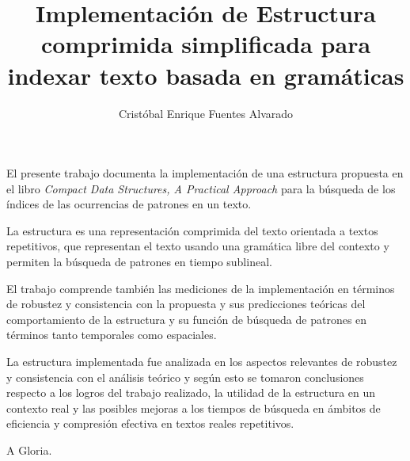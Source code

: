 \documentclass{umemoria}
\author{Cristóbal Enrique Fuentes Alvarado}
\title{Implementación de Estructura comprimida simplificada para indexar texto basada en gramáticas}
\begin{document}
\frontmatter
\maketitle

\begin{resumen}

El presente trabajo documenta la implementación de una estructura propuesta en el libro \textit{Compact Data Structures, A Practical Approach} para la búsqueda de los índices de las ocurrencias de patrones en un texto. 

La estructura es una representación comprimida del texto orientada a textos
repetitivos, que representan el texto usando una gramática libre del contexto
y permiten la búsqueda de patrones en tiempo sublineal.

El trabajo comprende también las mediciones de la implementación en términos de robustez y consistencia con la propuesta y sus predicciones teóricas del comportamiento de la estructura y su función de búsqueda de patrones en términos tanto temporales como espaciales. 

La estructura implementada fue analizada en los aspectos relevantes de robustez y consistencia con el análisis teórico y según esto se tomaron conclusiones respecto a los logros del trabajo realizado, la utilidad de la estructura en un contexto real y las posibles mejoras a los tiempos de búsqueda en ámbitos de eficiencia y compresión efectiva en textos reales repetitivos.



\end{resumen}


\begin{dedicatoria}
A Gloria.
\end{dedicatoria}


\tableofcontents
\listoftables %
\listoffigures %

\mainmatter








\nocite{*}



\begin{appendices}

\end{appendices}
\end{document}
